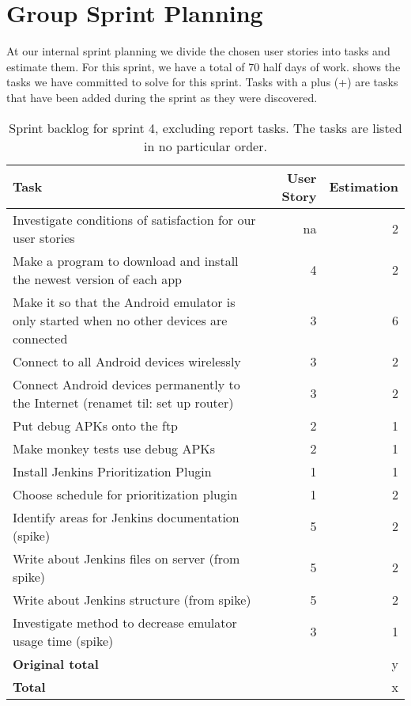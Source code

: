 \section{Group Sprint Planning}\label{sec:S4_group}
At our internal sprint planning we divide the chosen user stories into tasks and estimate them. For this sprint, we have a total of 70 half days of work.  shows the tasks we have committed to solve for this sprint. Tasks with a plus (+) are tasks that have been added during the sprint as they were discovered.

\begin{table}%
  \centering
  \begin{tabular}{p{}rr}
    \toprule
    \textbf{Task} & \textbf{User Story} & \textbf{Estimation} \\
    \midrule
    Investigate conditions of satisfaction for our user stories & na & 2 \\
    Make a program to download and install the newest version of each app & 4 & 2 \\
    Make it so that the Android emulator is only started when no other devices are connected & 3 & 6 \\
    Connect to all Android devices wirelessly & 3 & 2 \\
    Connect Android devices permanently to the Internet (renamet til: set up router) & 3 & 2 \\
    Put debug APKs onto the ftp & 2 & 1 \\
    Make monkey tests use debug APKs & 2 & 1 \\
    Install Jenkins Prioritization Plugin & 1 & 1 \\
    Choose schedule for prioritization plugin & 1 & 2 \\
    Identify areas for Jenkins documentation (spike) & 5 & 2 \\
    Write about Jenkins files on server (from spike) & 5 & 2 \\
    Write about Jenkins structure (from spike) & 5 & 2 \\
    Investigate method to decrease emulator usage time (spike) & 3 & 1 \\
    \midrule
    \textbf{Original total} & & y \\
    \textbf{Total} & & x \\
    \bottomrule
  \end{tabular}
\caption[Sprint 4 backlog]{Sprint backlog for sprint 4, excluding report tasks. The tasks are listed in no particular order.}
\label{tab:sprint4_tasks}
\end{table}

